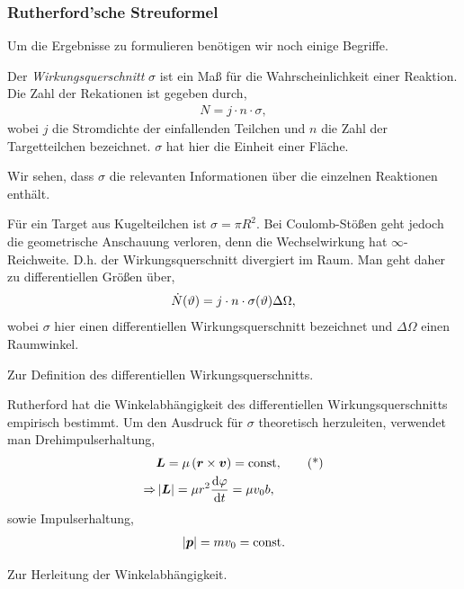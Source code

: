 \subsubsection{Rutherford'sche Streuformel}
	
Um die Ergebnisse zu formulieren benötigen wir noch einige Begriffe.
\begin{defnn}
Der \emph{Wirkungsquerschnitt} $\sigma$ ist ein Maß für die Wahrscheinlichkeit
einer Reaktion. Die Zahl der Rekationen ist gegeben durch,
\begin{align*}
N = j\cdot n\cdot\sigma,
\end{align*}
wobei $j$ die Stromdichte der einfallenden Teilchen und $n$ die Zahl der
Targetteilchen bezeichnet. $\sigma$ hat hier die Einheit einer Fläche.\fishhere
\end{defnn}

Wir sehen, dass $\sigma$ die relevanten Informationen über die
einzelnen Reaktionen enthält.

\begin{bemn}
Für ein Target aus Kugelteilchen ist $\sigma = \pi R^2$. Bei Coulomb-Stößen
geht jedoch die geometrische Anschauung verloren, denn die Wechselwirkung hat
$\infty$-Reichweite. D.h. der Wirkungsquerschnitt divergiert im Raum. Man geht
daher zu differentiellen Größen über,
\begin{align*}
\dot{N}(\vartheta) = j\cdot n\cdot\sigma(\vartheta)\Delta\Omega,
\end{align*}
wobei $\sigma$ hier einen differentiellen Wirkungsquerschnitt bezeichnet und
$\Delta \Omega$ einen Raumwinkel.\maphere
\end{bemn}

%
	{}
	{Zur Definition des differentiellen Wirkungsquerschnitts.}

Rutherford hat die Winkelabhängigkeit des differentiellen Wirkungsquerschnitts
empirisch bestimmt. Um den Ausdruck für $\sigma$ theoretisch herzuleiten,
verwendet man Drehimpulserhaltung,
\begin{align*}
&\bm{L} = \mu \left(\bm{r}\times\bm{v}\right) = \mathrm{const},\tag{*}\\
\Rightarrow & \left|\bm{L}\right| = \mu r^2 \frac{\mathrm{d} \varphi}{\,\mathrm{d} t\,} = \mu v_0 b,
\end{align*}
sowie Impulserhaltung,
\begin{align*}
\left|\bm{p}\right| = m v_0 = \mathrm{const}.
\end{align*}

%
	{}
	{Zur Herleitung der Winkelabhängigkeit.}

